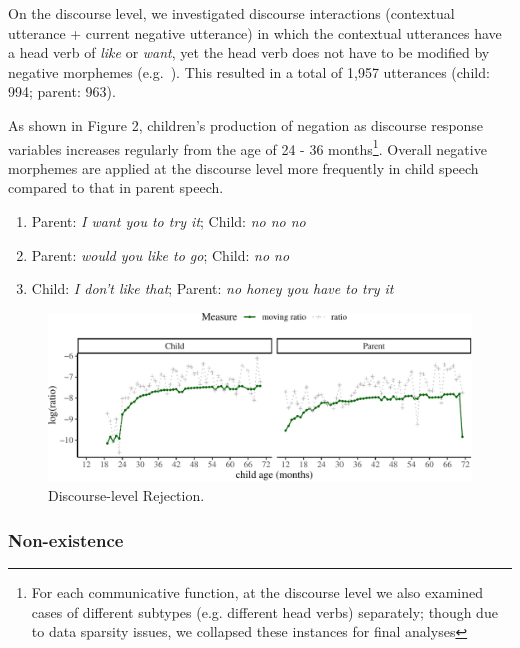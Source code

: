 \documentclass[
  english,
  man,floatsintext]{apa6}
\providecommand{\tightlist}{%
  \setlength{\itemsep}{0pt}\setlength{\parskip}{0pt}}
\begin{document}
On the discourse level, we investigated discourse interactions (contextual utterance + current negative utterance) in which the contextual utterances have a head verb of \emph{like} or \emph{want}, yet the head verb does not have to be modified by negative morphemes (e.g.~). This resulted in a total of 1,957 utterances (child: 994; parent: 963).

As shown in Figure 2, children's production of negation as discourse response variables increases regularly from the age of 24 - 36 months\footnote{For each communicative function, at the discourse level we also examined cases of different subtypes (e.g. different head verbs) separately; though due to data sparsity issues, we collapsed these instances for final analyses}. Overall negative morphemes are applied at the discourse level more frequently in child speech compared to that in parent speech.

\begin{enumerate}
\def\labelenumi{(\arabic{enumi})}
\setcounter{enumi}{5}
\tightlist
\item
  Parent: \emph{I want you to try it}; Child: \emph{no no no}
\item
  Parent: \emph{would you like to go}; Child: \emph{no no}
\item
  Child: \emph{I don't like that}; Parent: \emph{no honey you have to try it}
\end{enumerate}

\begin{figure}[H]

{\centering \includegraphics{neg_construction_article_files/figure-latex/emotiondiscourse-1} 

}

\caption{Discourse-level Rejection.}\label{fig:emotiondiscourse}
\end{figure}

\hypertarget{non-existence}{%
\subsubsection{Non-existence}\label{non-existence}}
\end{document}

